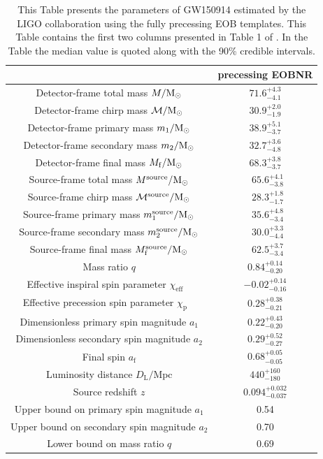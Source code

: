 \begin{table}
\begin{tabular}{|c|c|}
\hline
& precessing EOBNR \\
\hline
Detector-frame total mass $M/\mathrm{M}_\odot$ & $71.6^{+4.3}_{-4.1}$ \\
Detector-frame chirp mass $\mathcal{M}/\mathrm{M}_\odot$ & $30.9^{+2.0}_{-1.9}$ \\
Detector-frame primary mass $m_1/\mathrm{M}_\odot$ & $38.9^{+5.1}_{-3.7}$  \\
Detector-frame secondary mass $m_2/\mathrm{M}_\odot$ & $32.7^{+3.6}_{-4.8}$  \\
Detector-frame final mass $M_\mathrm{f}/\mathrm{M}_\odot$ & $68.3^{+3.8}_{-3.7}$ \\ \hline
Source-frame total mass $M^{\mathrm{source}}/\mathrm{M}_\odot$ & \
$65.6^{+4.1}_{-3.8}$ \\
Source-frame chirp mass $\mathcal{M}^{\mathrm{source}}/\mathrm{M}_\odot$ & \
$28.3^{+1.8}_{-1.7}$ \\
Source-frame primary mass $m_1^{\mathrm{source}}/\mathrm{M}_\odot$ & \
$35.6^{+4.8}_{-3.4}$ \\
Source-frame secondary mass $m_2^{\mathrm{source}}/\mathrm{M}_\odot$ & \
$30.0^{+3.3}_{-4.4}$ \\
Source-frame final mass $M_\mathrm{f}^{\mathrm{source}}/\mathrm{M}_\odot$ & \
$62.5^{+3.7}_{-3.4}$\\
 \hline
Mass ratio $q$ & $0.84^{+0.14}_{-0.20}$ \\
\hline
Effective inspiral spin parameter $\chi_\mathrm{eff}$ \
&$-0.02^{+0.14}_{-0.16}$  \\
Effective precession spin parameter $\chi_\mathrm{p}$ \
&$0.28^{+0.38}_{-0.21}$  \\
Dimensionless primary spin magnitude $a_1$ &$0.22^{+0.43}_{-0.20}$ \\
Dimensionless secondary spin magnitude $a_2$ &$0.29^{+0.52}_{-0.27}$  \\
Final spin $a_\mathrm{f}$ &$0.68^{+0.05}_{-0.05}$ \\
 \hline
Luminosity distance $D_\mathrm{L}/\mathrm{Mpc}$ &$440^{+160}_{-180}$ \\
Source redshift $z$ &$0.094^{+0.032}_{-0.037}$ \\
\hline
Upper bound on primary spin magnitude $a_1$ & 0.54\\
Upper bound on secondary spin magnitude $a_2$ & 0.70\\
Lower bound on mass ratio $q$ & 0.69 \\ \hline
\end{tabular}
\caption{This Table presents the parameters of GW150914 estimated by the LIGO collaboration using the fully precessing EOB templates. This Table contains the first two columns presented in Table 1 of \cite{gw150914PEseobnrv3}. In the Table the median value is quoted along with the 90\% credible intervals.}
\label{tab:PEwithSEOBNRV3}
\end{table}

